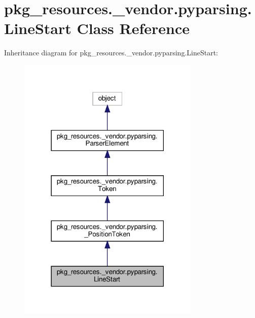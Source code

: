 \hypertarget{classpkg__resources_1_1__vendor_1_1pyparsing_1_1LineStart}{}\section{pkg\+\_\+resources.\+\_\+vendor.\+pyparsing.\+Line\+Start Class Reference}
\label{classpkg__resources_1_1__vendor_1_1pyparsing_1_1LineStart}


Inheritance diagram for pkg\+\_\+resources.\+\_\+vendor.\+pyparsing.\+Line\+Start\+:
\nopagebreak
\begin{figure}[H]
\begin{center}
\leavevmode
\includegraphics[width=246pt]{classpkg__resources_1_1__vendor_1_1pyparsing_1_1LineStart__inherit__graph}
\end{center}
\end{figure}


